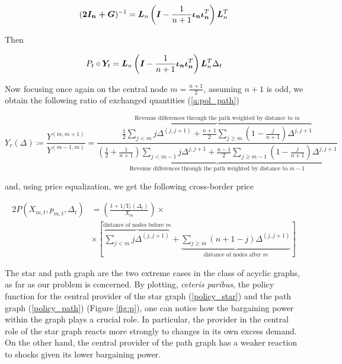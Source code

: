 \begin{equation}
  (\bm{2I_n + \bm{G}})^{-1} = \bm{L}_n  \left(\bm{I} - \frac{1}{n+1} \bm{\iota_n \iota_n}^T\right) \bm{L}_n^T
\end{equation}

Then

\begin{equation*}
  \begin{split}
    P_t \circ \bm{Y}_t &= \bm{L}_n  \left(\bm{I} - \frac{1}{n+1} \bm{\iota_n \iota_n}^T\right) \bm{L}_n^T  \Delta_t \\
  \end{split}
\end{equation*}

Now focusing once again on the central node $m = \frac{n+1}{2}$, assuming $n+1$ is odd, we obtain the following ratio of exchanged quantities (\ref{a:pol_path})

\begin{equation}
  Y_r(\Delta) \coloneqq \frac{Y^{(m, m+1)}}{Y^{(m-1, m)}}
  = \frac{
    \overbrace{\frac{1}{2} \sum_{j < m} j \Delta^{(j, j+1)} + \frac{n+1}{2}\sum_{j \geq m} \left(1 - \frac{j}{n+1}\right) \Delta^{j, j+1}}^{\text{Revenue differences through the path weighted by distance to } m}
  }{
    \underbrace{\left(\frac{1}{2} + \frac{1}{n+1}\right) \sum_{j < m-1} j \Delta^{j, j+1}+ \frac{n-1}{2} \sum_{j \geq m-1} \left(1 - \frac{j}{n+1}\right) \Delta^{j, j+1}}_{\text{Revenue differences through the path weighted by distance to } m-1}
  }
\end{equation}

and, using price equalization, we get the following cross-border price

\begin{equation} \label{policy_path}
  \begin{split}
    2 P(X_{m, t}, p_{m, t}, \Delta_t) &= \left( \frac{1 + 1 / Y_r(\Delta_t)}{X_m} \right) \times  \\
    &\times \left[ \overbrace{\sum_{j < m} j \Delta^{(j, j + 1)}}^{\text{distance of nodes before } m} +  \underbrace{\sum_{j \geq m}\left(n + 1 - j\right) \Delta^{(j, j + 1)}}_{\text{distance of nodes after } m} \right]
  \end{split}
\end{equation}

The star and path graph are the two extreme cases in the class of acyclic graphs, as far as our problem is concerned. By plotting, \textit{ceteris paribus}, the policy function for the central provider of the star graph (\ref{policy_star}) and the path graph (\ref{policy_path}) (Figure \ref{fig:p}), one can notice how the bargaining power within the graph plays a crucial role. In particular, the provider in the central role of the star graph reacts more strongly to changes in its own excess demand. On the other hand, the central provider of the path graph has a weaker reaction to shocks given its lower bargaining power.

